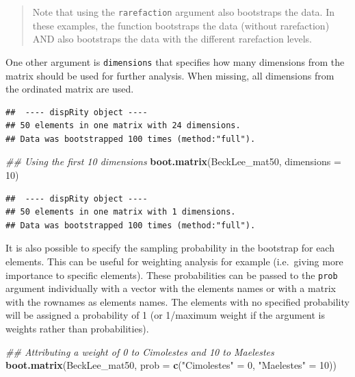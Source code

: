\documentclass[]{book}
\newenvironment{Shaded}{\begin{snugshade}}{\end{snugshade}}
\newcommand{\CommentTok}[1]{\textcolor[rgb]{0.56,0.35,0.01}{\textit{#1}}}
\newcommand{\DataTypeTok}[1]{\textcolor[rgb]{0.13,0.29,0.53}{#1}}
\newcommand{\DecValTok}[1]{\textcolor[rgb]{0.00,0.00,0.81}{#1}}
\newcommand{\FloatTok}[1]{\textcolor[rgb]{0.00,0.00,0.81}{#1}}
\newcommand{\KeywordTok}[1]{\textcolor[rgb]{0.13,0.29,0.53}{\textbf{#1}}}
\newcommand{\NormalTok}[1]{#1}
\newcommand{\StringTok}[1]{\textcolor[rgb]{0.31,0.60,0.02}{#1}}
\begin{document}
\begin{quote}
Note that using the \texttt{rarefaction} argument also bootstraps the data. In these examples, the function bootstraps the data (without rarefaction) AND also bootstraps the data with the different rarefaction levels.
\end{quote}

One other argument is \texttt{dimensions} that specifies how many dimensions from the matrix should be used for further analysis.
When missing, all dimensions from the ordinated matrix are used.

\begin{Shaded}
\end{Shaded}

\begin{verbatim}
##  ---- dispRity object ---- 
## 50 elements in one matrix with 24 dimensions.
## Data was bootstrapped 100 times (method:"full").
\end{verbatim}

\begin{Shaded}
\begin{Highlighting}[]
\CommentTok{## Using the first 10 dimensions}
\KeywordTok{boot.matrix}\NormalTok{(BeckLee_mat50, }\DataTypeTok{dimensions =} \DecValTok{10}\NormalTok{)}
\end{Highlighting}
\end{Shaded}

\begin{verbatim}
##  ---- dispRity object ---- 
## 50 elements in one matrix with 1 dimensions.
## Data was bootstrapped 100 times (method:"full").
\end{verbatim}

It is also possible to specify the sampling probability in the bootstrap for each elements.
This can be useful for weighting analysis for example (i.e.~giving more importance to specific elements).
These probabilities can be passed to the \texttt{prob} argument individually with a vector with the elements names or with a matrix with the rownames as elements names.
The elements with no specified probability will be assigned a probability of 1 (or 1/maximum weight if the argument is weights rather than probabilities).

\begin{Shaded}
\begin{Highlighting}[]
\CommentTok{## Attributing a weight of 0 to Cimolestes and 10 to Maelestes}
\KeywordTok{boot.matrix}\NormalTok{(BeckLee_mat50,}
            \DataTypeTok{prob =} \KeywordTok{c}\NormalTok{(}\StringTok{"Cimolestes"}\NormalTok{ =}\StringTok{ }\DecValTok{0}\NormalTok{, }\StringTok{"Maelestes"}\NormalTok{ =}\StringTok{ }\DecValTok{10}\NormalTok{))}
\end{Highlighting}
\end{Shaded}
\end{document}
